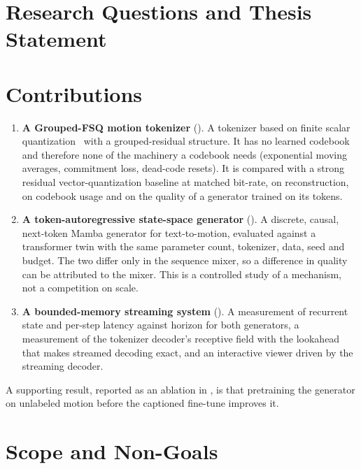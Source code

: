 \section{Research Questions and Thesis Statement}
\label{sec:intro_questions}


\section{Contributions}
\label{sec:intro_contributions}

\begin{enumerate}
\item \textbf{A Grouped-FSQ motion tokenizer} (). A tokenizer based on finite scalar quantization~\cite{mentzer2023fsq} with a grouped-residual structure. It has no learned codebook and therefore none of the machinery a codebook needs (exponential moving averages, commitment loss, dead-code resets). It is compared with a strong residual vector-quantization baseline at matched bit-rate, on reconstruction, on codebook usage and on the quality of a generator trained on its tokens.

\item \textbf{A token-autoregressive state-space generator} (). A discrete, causal, next-token Mamba generator for text-to-motion, evaluated against a transformer twin with the same parameter count, tokenizer, data, seed and budget. The two differ only in the sequence mixer, so a difference in quality can be attributed to the mixer. This is a controlled study of a mechanism, not a competition on scale.

\item \textbf{A bounded-memory streaming system} (). A measurement of recurrent state and per-step latency against horizon for both generators, a measurement of the tokenizer decoder's receptive field with the lookahead that makes streamed decoding exact, and an interactive viewer driven by the streaming decoder.
\end{enumerate}

A supporting result, reported as an ablation in , is that pretraining the generator on unlabeled motion before the captioned fine-tune improves it.

\section{Scope and Non-Goals}
\label{sec:intro_scope}

